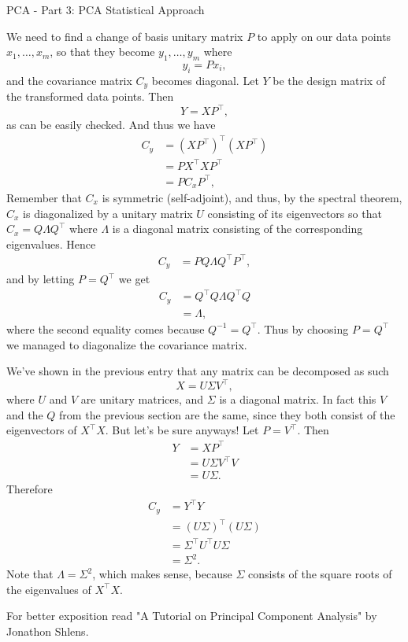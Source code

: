 \begin{entry}[4]{PCA - Part 3: PCA Statistical Approach}
\begin{entrysection} 
We need to find a change of basis unitary matrix $P$ to apply on our data points $x_1, \ldots, x_m$, so that they become $y_1,\ldots,y_m$ where
\[ y_i = Px_i, \]
and the covariance matrix $C_y$ becomes diagonal. Let $Y$ be the design matrix of the transformed data points. Then
\[ Y = XP^{\top}, \]
as can be easily checked. And thus we have
\begin{align*}
C_y &= (XP^{\top})^{\top} (XP^{\top}) \\
&= PX^{\top}XP^{\top} \\
&= PC_xP^{\top},
\end{align*}
Remember that $C_x$ is symmetric (self-adjoint), and thus, by the spectral theorem, $C_x$ is diagonalized by a unitary matrix $U$ consisting of its eigenvectors so that $C_x = Q \Lambda Q^{\top}$ where $\Lambda$ is a diagonal matrix consisting of the corresponding eigenvalues. Hence
\begin{align*}
C_y &= PQ\Lambda Q^{\top}P^{\top},
\end{align*}
and by letting $P = Q^{\top}$ we get
\begin{align*}
    C_y &= Q^{\top}Q \Lambda Q^{\top}Q \\
    &= \Lambda,
\end{align*}
where the second equality comes because $Q^{-1} = Q^{\top}$. Thus by choosing $P = Q^{\top}$ we managed to diagonalize the covariance matrix.
\end{entrysection}

\begin{entrysection} 
We've shown in the previous entry that any matrix can be decomposed as such
\[ X = U \Sigma V^{\top}, \]
where $U$ and $V$ are unitary matrices, and $\Sigma$ is a diagonal matrix. In fact this $V$ and the $Q$ from the previous section are the same, since they both consist of the eigenvectors of $X^{\top}X$. But let's be sure anyways! Let $P = V^{\top}$. Then 
\begin{align*}
    Y &= XP^{\top} \\
    &= U \Sigma V^{\top} V\\
    &= U \Sigma.
\end{align*}
Therefore
\begin{align*}
    C_y &= Y^{\top}Y \\ 
    &= (U \Sigma)^{\top}(U \Sigma)\\
    &= \Sigma^{\top} U^{\top} U \Sigma \\
    &= \Sigma^2.
\end{align*}
Note that $\Lambda = \Sigma^2$, which makes sense, because $\Sigma$ consists of the square roots of the eigenvalues of $X^{\top}X$.
\end{entrysection}

\begin{entrysection}
For better exposition read "A Tutorial on Principal Component Analysis" by Jonathon Shlens.
\end{entrysection}

\end{entry}
